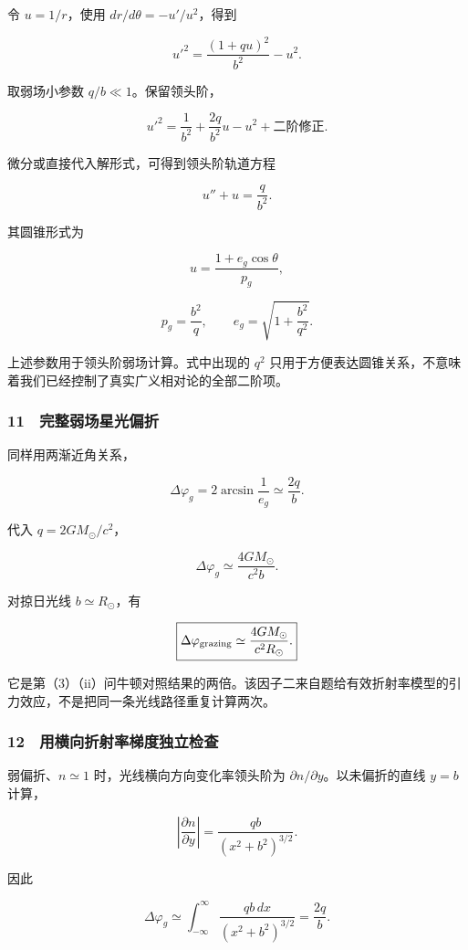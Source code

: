 \documentclass[12pt,a4paper,fontset=fandol]{ctexart}
\begin{document}
令 \(u=1/r\)，使用 \(dr/d\theta=-u'/u^2\)，得到

\[\boxed{u'^2=\frac{(1+qu)^2}{b^2}-u^2.}\]

取弱场小参数 \(q/b\ll1\)。保留领头阶，

\[u'^2=\frac1{b^2}+\frac{2q}{b^2}u-u^2
+\text{二阶修正}.\]

微分或直接代入解形式，可得到领头阶轨道方程

\[u''+u=\frac q{b^2}.\]

其圆锥形式为

\[u=\frac{1+e_g\cos\theta}{p_g},\]

\[\boxed{p_g=\frac{b^2}{q},
\qquad e_g=\sqrt{1+\frac{b^2}{q^2}}.}\]

上述参数用于领头阶弱场计算。式中出现的 \(q^2\)
只用于方便表达圆锥关系，不意味着我们已经控制了真实广义相对论的全部二阶项。

\subsubsection{11　完整弱场星光偏折}\label{ux5b8cux6574ux5f31ux573aux661fux5149ux504fux6298}

同样用两渐近角关系，

\[\Delta\varphi_g=2\arcsin\frac1{e_g}
\simeq\frac{2q}{b}.\]

代入 \(q=2GM_\odot/c^2\)，

\[\boxed{\Delta\varphi_g
\simeq\frac{4GM_\odot}{c^2b}.}\]

对掠日光线 \(b\simeq R_\odot\)，有

\[\boxed{\Delta\varphi_{\rm grazing}
\simeq\frac{4GM_\odot}{c^2R_\odot}.}\]

它是第（3）（ii）问牛顿对照结果的两倍。该因子二来自题给有效折射率模型的引力效应，不是把同一条光线路径重复计算两次。

\subsubsection{12　用横向折射率梯度独立检查}\label{ux7528ux6a2aux5411ux6298ux5c04ux7387ux68afux5ea6ux72ecux7acbux68c0ux67e5}

弱偏折、\(n\simeq1\) 时，光线横向方向变化率领头阶为
\(\partial n/\partial y\)。以未偏折的直线 \(y=b\) 计算，

\[\left|\frac{\partial n}{\partial y}\right|
=\frac{qb}{(x^2+b^2)^{3/2}}.\]

因此

\[\Delta\varphi_g\simeq
\int_{-\infty}^{\infty}\frac{qb\,dx}{(x^2+b^2)^{3/2}}
=\frac{2q}{b}.\]
\end{document}
